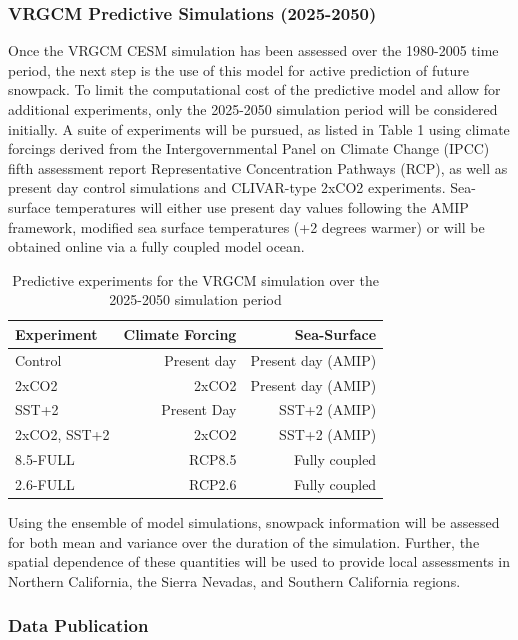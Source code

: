 \documentclass[11pt]{article}
\begin{document}
\subsubsection{VRGCM Predictive Simulations (2025-2050)}
Once the VRGCM CESM simulation has been assessed over the 1980-2005 time period, the next step is the use of this model for active prediction of future snowpack. To limit the computational cost of the predictive model and allow for additional experiments, only the 2025-2050 simulation period will be considered initially. A suite of experiments will be pursued, as listed in Table 1 using climate forcings derived from the Intergovernmental Panel on Climate Change (IPCC) fifth assessment report Representative Concentration Pathways (RCP), as well as present day control simulations and CLIVAR-type 2xCO2 experiments. Sea-surface temperatures will either use present day values following the AMIP framework, modified sea surface temperatures (+2 degrees warmer) or will be obtained online via a fully coupled model ocean.

\begin{table}[t1]
\begin{center}
\caption{Predictive experiments for the VRGCM simulation over the 2025-2050 simulation period}
\begin{tabular}{|l|r|r|} \hline
Experiment & Climate Forcing & Sea-Surface \\\hline
Control & Present day & Present day (AMIP) \\
2xCO2 & 2xCO2 & Present day (AMIP) \\
SST+2 & Present Day & SST+2 (AMIP) \\
2xCO2, SST+2 & 2xCO2 & SST+2 (AMIP) \\
8.5-FULL & RCP8.5 & Fully coupled \\
2.6-FULL & RCP2.6 & Fully coupled \\\hline
\end{tabular}
\end{center}
\end{table}

Using the ensemble of model simulations, snowpack information will be assessed for both mean and variance over the duration of the simulation. Further, the spatial dependence of these quantities will be used to provide local assessments in Northern California, the Sierra Nevadas, and Southern California regions.

\subsubsection{Data Publication}
\end{document}
